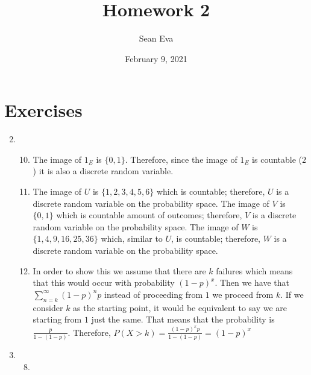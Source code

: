 \documentclass{article}
\title{Homework 2}
\author{Sean Eva}
\date{February 9, 2021}
\begin{document}
\maketitle

\section{Exercises}

\begin{enumerate}
    \setcounter{enumi}{1}
    \item
    
    \begin{enumerate}
        \setcounter{enumii}{9}
        \item 
        
        The image of $1_E$ is $\{0, 1\}$. Therefore, since the image of $1_E$ is countable ($2$) it is also a discrete random variable.
        
        \item
        
        The image of $U$ is $\{1, 2, 3, 4, 5, 6\}$ which is countable; therefore, $U$ is a discrete random variable on the probability space. The image of $V$ is $\{0, 1\}$ which is countable amount of outcomes; therefore, $V$ is a discrete random variable on the probability space. The image of $W$ is $\{1, 4, 9, 16, 25, 36\}$ which, similar to $U$, is countable; therefore, $W$ is a discrete random variable on the probability space.
        
        \setcounter{enumii}{23}
        \item
        
        In order to show this we assume that there are $k$ failures which means that this would occur with probability $(1-p)^x$. Then we have that $\sum_{n=k}^{\infty}(1-p)^np$ instead of proceeding from $1$ we proceed from $k$. If we consider $k$ as the starting point, it would be equivalent to say we are starting from $1$ just the same. That means that the probability is $\frac{p}{1-(1-p)}$. Therefore, $P(X>k)=\frac{(1-p)^xp}{1-(1-p)}=(1-p)^x$
        
    \end{enumerate}
    
    \item
    
    \begin{enumerate}
        \setcounter{enumii}{7}
        \item 
        

\end{enumerate}
\end{enumerate}
\end{document}

